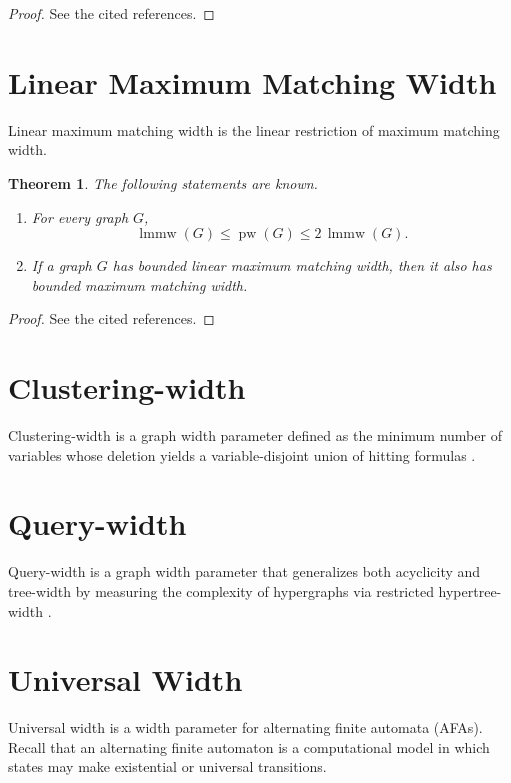 \documentclass[10pt]{book}
\newtheorem{theorem}{Theorem}[section]
\theoremstyle{definition}
\begin{document}
\begin{proof}
See the cited references.
\end{proof}

\section{Linear Maximum Matching Width}
Linear maximum matching width is the linear restriction of maximum matching width.

\begin{theorem}
The following statements are known.
\begin{enumerate}
    \item For every graph \(G\),
    \[
    \operatorname{lmmw}(G)\leq \operatorname{pw}(G)\leq 2\,\operatorname{lmmw}(G).
    \]
    \cite{330}

    \item If a graph \(G\) has bounded linear maximum matching width, then it also has bounded maximum matching width.
\end{enumerate}
\end{theorem}

\begin{proof}
See the cited references.
\end{proof}

\section{Clustering-width}
Clustering-width is a graph width parameter defined as the minimum number of variables whose deletion yields a variable-disjoint union of hitting formulas \cite{154}.

\section{Query-width}
Query-width is a graph width parameter that generalizes both acyclicity and tree-width by measuring the complexity of hypergraphs via restricted hypertree-width \cite{187,188}.

\section{Universal Width}
Universal width \cite{192,205} is a width parameter for alternating finite automata (AFAs).  
Recall that an alternating finite automaton is a computational model in which states may make existential or universal transitions.
\end{document}
